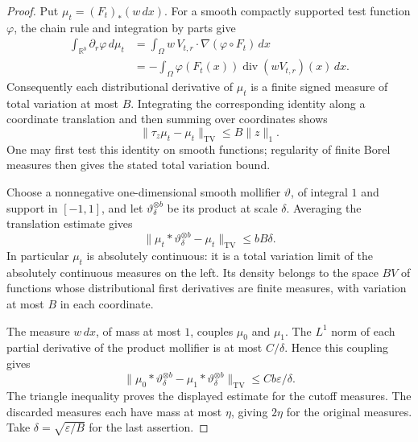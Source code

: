 \begin{proof}
Put $\mu_t=(F_t)_*(w\,dx)$.  For a smooth compactly supported test
function $\varphi$, the chain rule and integration by parts give
\begin{align*}
 \int_{\mathbb R^b}\partial_r\varphi\,d\mu_t
 &=\int_\Omega w\,V_{t,r}\cdot\nabla(\varphi\circ F_t)\,dx\\
 &=-\int_\Omega\varphi(F_t(x))
                   \operatorname{div}(wV_{t,r})(x)\,dx.
\end{align*}
Consequently each distributional derivative of $\mu_t$ is a finite signed
measure of total variation at most $B$. Integrating the corresponding
identity along a coordinate translation and then summing over coordinates
shows
\[
 \|\tau_z\mu_t-\mu_t\|_{\mathrm{TV}}\leq B\|z\|_1.
\]
One may first test this identity on smooth functions; regularity of finite
Borel measures then gives the stated total variation bound.

Choose a nonnegative one-dimensional smooth mollifier $\vartheta$, of
integral $1$ and support in $[-1,1]$, and let
$\vartheta_\delta^{\otimes b}$ be its product at scale $\delta$. Averaging
the translation estimate gives
\[
 \|\mu_t*\vartheta_\delta^{\otimes b}-\mu_t\|_{\mathrm{TV}}
 \leq bB\delta.
\]
In particular $\mu_t$ is absolutely continuous: it is a total variation
limit of the absolutely continuous measures on the left. Its density belongs to the space $BV$ of functions whose distributional
first derivatives are finite measures, with variation at most $B$ in each
coordinate.

The measure $w\,dx$, of mass at most $1$, couples $\mu_0$ and $\mu_1$.
The $L^1$ norm of each partial derivative of the product mollifier is at
most $C/\delta$. Hence this coupling gives
\[
 \|\mu_0*\vartheta_\delta^{\otimes b}
          -\mu_1*\vartheta_\delta^{\otimes b}\|_{\mathrm{TV}}
 \leq Cb\varepsilon/\delta.
\]
The triangle inequality proves the displayed estimate for the cutoff
measures. The discarded measures each have mass at most $\eta$, giving
$2\eta$ for the original measures. Take
$\delta=\sqrt{\varepsilon/B}$ for the last assertion.
\end{proof}

